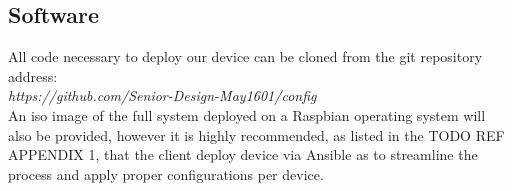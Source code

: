 \subsection{Software}
All code necessary to deploy our device can be cloned from the git repository address:
\\\newline
\textit{https://github.com/Senior-Design-May1601/config}
\\\newline
An iso image of the full system deployed on a Raspbian operating system will also be provided, however it is highly recommended, as listed in the {TODO REF APPENDIX 1}, that the client deploy device via Ansible as to streamline the process and apply proper configurations per device.

